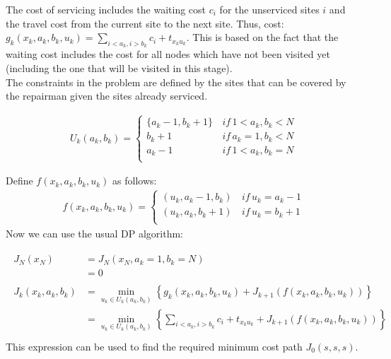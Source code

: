 \documentclass[11pt, oneside]{article}   	%
\begin{document}
The cost of servicing includes the waiting cost $c_i$ for the unserviced sites $i$ and the travel cost from the current site to the next site.
Thus, cost: $g_k(x_k, a_k, b_k, u_k)=\sum_{i<a_k, i>b_k}c_i + t_{x_k u_k}$. This is based on the fact that the waiting cost includes the cost for all nodes which have not been visited yet (including the one that will be visited in this stage).\\

The constraints in the problem are defined by the sites that can be covered by the repairman given the sites already serviced.

\begin{align*}
U_{k}(a_{k},b_{k}) =
\begin{cases}
	\{a_{k}-1, b_k +1 \}  \, & if \, 1 < a_k, b_k < N \\
	 b_k + 1 \, & if \, a_{k}=1,b_{k} < N\\
	 a_k - 1  \, & if \, 1 < a_{k},b_{k}=N\\
\end{cases}
\end{align*}

Define $f(x_k,a_k,b_k,u_k)$ as follows:
\begin{align*}
f(x_k,a_k,b_k,u_k) =
\begin{cases}
	(u_k, a_k - 1, b_k)  \, & if \, u_k = a_{k} - 1 \\
	 (u_k, a_k, b_k + 1) \, & if \, u_{k}=b_{k} + 1\\
\end{cases}
\end{align*}
Now we can use the usual DP algorithm:

\begin{align*}
\begin{split}
J_{N}(x_{N}) &= J_N (x_{N}, a_k =1, b_k = N)\\
&= 0\\
\\
J_k(x_k, a_k, b_k) &= \min_{u_k \in U_k(a_k, b_k)} \left\{g_k(x_k,a_k,b_k,u_k) + J_{k+1} (f(x_k, a_k, b_k, u_k)) \right\}\\
&= \min_{u_k \in U_k(a_k, b_k)} \left\{ \sum_{i<a_k, i>b_k}c_i + t_{x_k u_k} + J_{k+1} (f(x_k, a_k, b_k, u_k)) \right\}\\
\end{split}
\end{align*}
This expression can be used to find the required minimum cost path $J_0(s,s,s)$.
\end{document}
